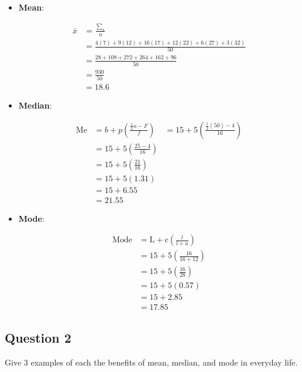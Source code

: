 \documentclass[12pt,titlepage]{article}
\begin{document}
\begin{itemize}
    \item {
        \textbf{Mean}:

        \begin{align*}
            \bar{x} &= \frac{\sum_ x}{n} \\
            &= \frac{4(7) + 9(12) + 16(17) + 12(22) + 6(27) + 3(32)}{50} \\
            &= \frac{28 + 108 + 272 + 264 + 162 + 96}{50} \\
            &= \frac{930}{50} \\
            &= 18.6
        \end{align*}
    }
    \item {
        \textbf{Median}:

        \begin{align*}
            \text{Me} &= b + p \left( \frac{\frac{1}{2}n - F}{f} \right)
            &= 15 + 5 \left( \frac{\frac{1}{2}(50) - 4}{16} \right) \\
            &= 15 + 5 \left( \frac{25 - 4}{16} \right) \\
            &= 15 + 5 \left( \frac{21}{16} \right) \\
            &= 15 + 5 \left( 1.31 \right) \\
            &= 15 + 6.55 \\
            &= 21.55
        \end{align*}
    }
    \item {
        \textbf{Mode}:

        \begin{align*}
            \text{Mode} &= \text{L} + \text{c} \left( \frac{l}{l+u} \right) \\
            &= 15 + 5 \left( \frac{16}{16 + 12} \right) \\
            &= 15 + 5 \left( \frac{16}{28} \right) \\
            &= 15 + 5 \left( 0.57 \right) \\
            &= 15 + 2.85 \\
            &= 17.85
        \end{align*}
    }
\end{itemize}
\pagebreak

\subsection{Question 2}
Give 3 examples of each the benefits of mean, median, and mode in everyday life.
\end{document}
